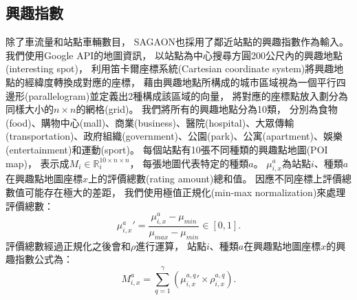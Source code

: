 \documentclass[a4paper,14pt]{extarticle}
\begin{document}
        \subsection{興趣指數}
            \label{subsec:point_of_interest}
            除了車流量和站點車輛數目，
            SAGAON也採用了鄰近站點的興趣指數作為輸入。
            我們使用Google API的地圖資訊，
            以站點為中心搜尋方圓200公尺內的興趣地點(interesting spot)，
            利用笛卡爾座標系統(Cartesian coordinate system)將興趣地點的經緯度轉換成對應的座標，
            藉由興趣地點所構成的城市區域視為一個平行四邊形(parallelogram)並定義出2種構成該區域的向量，
            將對應的座標點放入劃分為同樣大小的$n \times n$的網格(grid)。
            我們將所有的興趣地點分為10類，
            分別為食物(food)、購物中心(mall)、商業(business)、醫院(hospital)、大眾傳輸(transportation)、政府組織(government)、公園(park)、公寓(apartment)、娛樂(entertainment)和運動(sport)。
            每個站點有10張不同種類的興趣點地圖(POI map)，
            表示成$M_i \in \mathbb{R}_i^{10 \times n\times n}$，
            每張地圖代表特定的種類$a$。
            $\mu_{i,x}^a$為站點$i$、種類$a$在興趣點地圖座標$x$上的評價總數(rating amount)總和值。
            因應不同座標上評價總數值可能存在極大的差距，
            我們使用極值正規化(min-max normalization)來處理評價總數：
            \begin{equation}
                {\mu_{i,x}^a}' = \frac{\mu_{i,x}^a - \mu_{min}}{\mu_{max} - \mu_{min}} \in [0,1].
            \end{equation}
            評價總數經過正規化之後會和$\rho$進行運算，
            站點$i$、種類$a$在興趣點地圖座標$x$的興趣指數公式為：
            \begin{equation}
                M_{i,x}^a = \sum_{q=1}^{\gamma} ({\mu_{i,x}^{a,q}}' \times \rho_{i,x}^{a,q}).
            \end{equation}
\end{document}
